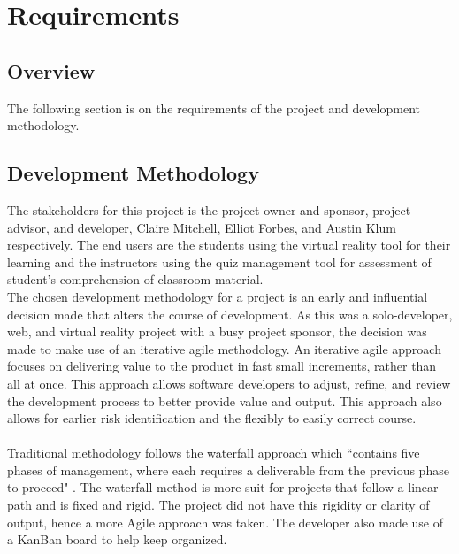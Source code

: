 \section{Requirements}
\label{sec:Requirements}

\subsection{Overview} 
The following section is on the requirements of the project and development methodology. 

\subsection{Development Methodology}
The stakeholders for this project is the project owner and sponsor, project advisor, and developer, Claire Mitchell, Elliot Forbes, and Austin Klum respectively. The end users are the students using the virtual reality tool for their learning and the instructors using the quiz management tool for assessment of student's comprehension of classroom material.
\\
The chosen development methodology for a project is an early and influential decision made that alters the course of development. As this was a solo-developer, web, and virtual reality project with a busy project sponsor, the decision was made to make use of an iterative agile methodology. An iterative agile approach focuses on delivering value to the product in fast small increments, rather than all at once. This approach allows software developers to adjust, refine, and review the development process to better provide value and output. This approach also allows for earlier risk identification and the flexibly to easily correct course.\\
\\
Traditional methodology follows the waterfall approach which ``contains five phases of management, where each requires a deliverable from the previous phase to proceed" \cite{waterfall}. The waterfall method is more suit for projects that follow a linear path and is fixed and rigid. The project did not have this rigidity or clarity of output, hence a more Agile approach was taken. The developer also made use of a KanBan board to help keep organized. 


